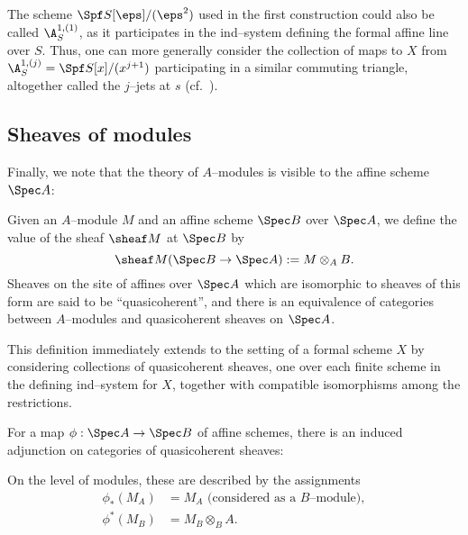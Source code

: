\begin{remark}\label{jJetsRemark}
The scheme $\Spf S[\eps] / (\eps^2)$ used in the first construction could also be called $\A^{1,(1)}_S$, as it participates in the ind--system defining the formal affine line over $S$.  Thus, one can more generally consider the collection of maps to $X$ from $\A^{1,(j)}_S = \Spf S[x] / (x^{j+1})$ participating in a similar commuting triangle, altogether called the $j$--jets at $s$ (cf.\ ).
\end{remark}

\subsection*{Sheaves of modules}

Finally, we note that the theory of $A$--modules is visible to the affine scheme $\Spec A$:
\begin{definition}\label{QCohDefinition}
Given an $A$--module $M$ and an affine scheme $\Spec B$ over $\Spec A$, we define the value of the sheaf $\sheaf M$ at $\Spec B$ by \[\sheaf M(\Spec B \to \Spec A) := M \otimes_A B.\]  Sheaves on the site of affines over $\Spec A$ which are isomorphic to sheaves of this form are said to be ``quasicoherent'', and there is an equivalence of categories between $A$--modules and quasicoherent sheaves on $\Spec A$.
\end{definition}

\begin{remark}
This definition immediately extends to the setting of a formal scheme $X$ by considering collections of quasicoherent sheaves, one over each finite scheme in the defining ind--system for $X$, together with compatible isomorphisms among the restrictions.
\end{remark}

\begin{definition}
For a map $\phi: \Spec A \to \Spec B$ of affine schemes, there is an induced adjunction on categories of quasicoherent sheaves:
\begin{center}
\end{center}
On the level of modules, these are described by the assignments
\begin{align*}
\phi_*(M_A) & = \text{$M_A$ (considered as a $B$--module)}, \\
\phi^*(M_B) & = M_B \otimes_B A.
\end{align*}
\end{definition}

